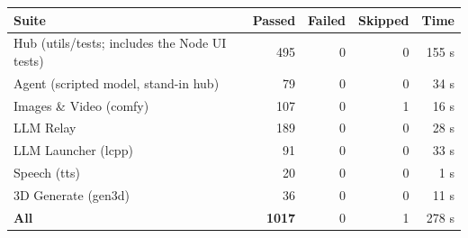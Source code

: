 \begin{tabular}{@{}lrrrr@{}}
\toprule
Suite & Passed & Failed & Skipped & Time \\
\midrule
Hub (utils/tests; includes the Node UI tests) & 495 & 0 & 0 & 155 s \\
Agent (scripted model, stand-in hub) & 79 & 0 & 0 & 34 s \\
Images \& Video (comfy) & 107 & 0 & 1 & 16 s \\
LLM Relay & 189 & 0 & 0 & 28 s \\
LLM Launcher (lcpp) & 91 & 0 & 0 & 33 s \\
Speech (tts) & 20 & 0 & 0 & 1 s \\
3D Generate (gen3d) & 36 & 0 & 0 & 11 s \\
\midrule
\textbf{All} & \textbf{1017} & 0 & 1 & 278 s \\
\bottomrule
\end{tabular}
